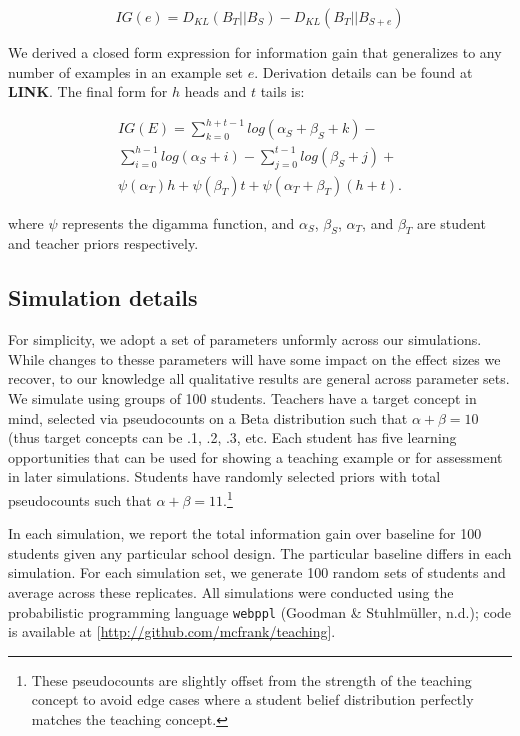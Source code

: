 \documentclass[10pt, letterpaper]{article}
\begin{document}
\[IG(e) = D_{KL}(B_T ||B_S) − D_{KL}(B_T || B_{S+e})\]

We derived a closed form expression for information gain that
generalizes to any number of examples in an example set \(e\).
Derivation details can be found at \textbf{LINK}. The final form for
\(h\) heads and \(t\) tails is:

\begin{multline}
IG(E) = \sum_{k=0}^{h+t-1} {log(\alpha_S + \beta_S + k)} - \\
\sum_{i=0}^{h-1} {log (\alpha_S + i)} - \sum_{j=0}^{t-1} {log(\beta_S +j)} + \\
\psi(\alpha_T)h + \psi(\beta_T)t +  \psi(\alpha_T + \beta_T)(h+t).
\end{multline}

where \(\psi\) represents the digamma function, and \(\alpha_S\),
\(\beta_S\), \(\alpha_T\), and \(\beta_T\) are student and teacher
priors respectively.

\subsection{Simulation details}\label{simulation-details}

For simplicity, we adopt a set of parameters unformly across our
simulations. While changes to thesse parameters will have some impact on
the effect sizes we recover, to our knowledge all qualitative results
are general across parameter sets. We simulate using groups of 100
students. Teachers have a target concept in mind, selected via
pseudocounts on a Beta distribution such that \(\alpha + \beta = 10\)
(thus target concepts can be .1, .2, .3, etc. Each student has five
learning opportunities that can be used for showing a teaching example
or for assessment in later simulations. Students have randomly selected
priors with total pseudocounts such that
\(\alpha + \beta = 11\).\footnote{These pseudocounts are slightly offset from the strength of the teaching concept to avoid edge cases where a student belief distribution perfectly matches the teaching concept.}

In each simulation, we report the total information gain over baseline
for 100 students given any particular school design. The particular
baseline differs in each simulation. For each simulation set, we
generate 100 random sets of students and average across these
replicates. All simulations were conducted using the probabilistic
programming language \texttt{webppl} (Goodman \& Stuhlmüller, n.d.);
code is available at {[}\url{http://github.com/mcfrank/teaching}{]}.
\end{document}
